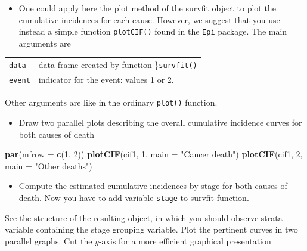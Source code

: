 \documentclass[
]{book}
\newenvironment{Shaded}{\begin{snugshade}}{\end{snugshade}}
\newcommand{\AttributeTok}[1]{\textcolor[rgb]{0.13,0.29,0.53}{#1}}
\newcommand{\DecValTok}[1]{\textcolor[rgb]{0.00,0.00,0.81}{#1}}
\newcommand{\FunctionTok}[1]{\textcolor[rgb]{0.13,0.29,0.53}{\textbf{#1}}}
\newcommand{\NormalTok}[1]{#1}
\newcommand{\StringTok}[1]{\textcolor[rgb]{0.31,0.60,0.02}{#1}}
\providecommand{\tightlist}{%
  \setlength{\itemsep}{0pt}\setlength{\parskip}{0pt}}
\begin{document}
\begin{itemize}
\tightlist
\item
  One could apply here the plot method of the survfit object to plot the
  cumulative incidences for each cause. However, we suggest that you use
  instead a simple function \texttt{plotCIF()} found in the \texttt{Epi} package.
  The main arguments are
\end{itemize}

\begin{longtable}[]{@{}ll@{}}
\toprule\noalign{}
\endhead
\bottomrule\noalign{}
\endlastfoot
\texttt{data} & data frame created by function \}\texttt{survfit()} \\
\texttt{event} & indicator for the event: values 1 or 2. \\
\end{longtable}

Other arguments are like in the ordinary \texttt{plot()} function.

\begin{itemize}
\tightlist
\item
  Draw two parallel plots describing
  the overall cumulative incidence curves for both causes of death
\end{itemize}

\begin{Shaded}
\begin{Highlighting}[]
\FunctionTok{par}\NormalTok{(}\AttributeTok{mfrow =} \FunctionTok{c}\NormalTok{(}\DecValTok{1}\NormalTok{, }\DecValTok{2}\NormalTok{))}
\FunctionTok{plotCIF}\NormalTok{(cif1, }\DecValTok{1}\NormalTok{, }\AttributeTok{main =} \StringTok{"Cancer death"}\NormalTok{)}
\FunctionTok{plotCIF}\NormalTok{(cif1, }\DecValTok{2}\NormalTok{, }\AttributeTok{main =} \StringTok{"Other deaths"}\NormalTok{)}
\end{Highlighting}
\end{Shaded}

\begin{itemize}
\tightlist
\item
  Compute the estimated
  cumulative incidences by stage for both causes of death.
  Now you have to add variable \texttt{stage} to survfit-function.
\end{itemize}

See the structure of the resulting object, in which you should
observe strata variable containing the stage grouping variable. Plot the pertinent curves in two parallel graphs.
Cut the \(y\)-axis for a more efficient graphical presentation
\end{document}
